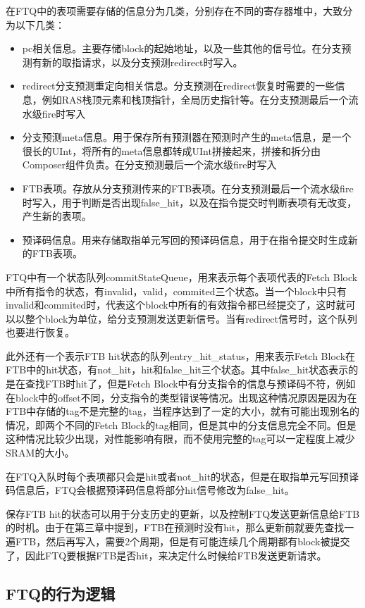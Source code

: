 在FTQ中的表项需要存储的信息分为几类，分别存在不同的寄存器堆中，大致分为以下几类：

\begin{itemize}
	\item pc相关信息。主要存储block的起始地址，以及一些其他的信号位。在分支预测有新的取指请求，以及分支预测redirect时写入。
	\item redirect分支预测重定向相关信息。分支预测在redirect恢复时需要的一些信息，例如RAS栈顶元素和栈顶指针，全局历史指针等。在分支预测最后一个流水级fire时写入
	\item 分支预测meta信息。用于保存所有预测器在预测时产生的meta信息，是一个很长的UInt，将所有的meta信息都转成UInt拼接起来，拼接和拆分由Composer组件负责。在分支预测最后一个流水级fire时写入
	\item FTB表项。存放从分支预测传来的FTB表项。在分支预测最后一个流水级fire时写入，用于判断是否出现false\_hit，以及在指令提交时判断表项有无改变，产生新的表项。
	\item 预译码信息。用来存储取指单元写回的预译码信息，用于在指令提交时生成新的FTB表项。
\end{itemize}

FTQ中有一个状态队列commitStateQueue，用来表示每个表项代表的Fetch Block中所有指令的状态，有invalid，valid，commited三个状态。当一个block中只有invalid和commited时，代表这个block中所有的有效指令都已经提交了，这时就可以以整个block为单位，给分支预测发送更新信号。当有redirect信号时，这个队列也要进行恢复。

此外还有一个表示FTB hit状态的队列entry\_hit\_status，用来表示Fetch Block在FTB中的hit状态，有not\_hit，hit和false\_hit三个状态。其中false\_hit状态表示的是在查找FTB时hit了，但是Fetch Block中有分支指令的信息与预译码不符，例如在block中的offset不同，分支指令的类型错误等情况。出现这种情况原因是因为在FTB中存储的tag不是完整的tag，当程序达到了一定的大小，就有可能出现别名的情况，即两个不同的Fetch Block的tag相同，但是其中的分支信息完全不同。但是这种情况比较少出现，对性能影响有限，而不使用完整的tag可以一定程度上减少SRAM的大小。

在FTQ入队时每个表项都只会是hit或者not\_hit的状态，但是在取指单元写回预译码信息后，FTQ会根据预译码信息将部分hit信号修改为false\_hit。

保存FTB hit的状态可以用于分支历史的更新，以及控制FTQ发送更新信息给FTB的时机。由于在第三章中提到，FTB在预测时没有hit，那么更新前就要先查找一遍FTB，然后再写入，需要2个周期，但是有可能连续几个周期都有block被提交了，因此FTQ要根据FTB是否hit，来决定什么时候给FTB发送更新请求。

\subsection{FTQ的行为逻辑}

